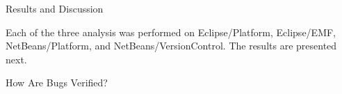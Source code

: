 \begin{section}{Results and Discussion} \label{sec:results}
	
	Each of the three analysis was performed on Eclipse/Platform, Eclipse/EMF, NetBeans/Platform, and NetBeans/VersionControl. The results are presented next.
	
% 	
% 	
	
\begin{subsection}{How Are Bugs Verified?}



\end{subsection}
\end{section}
